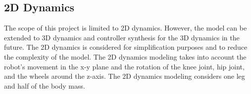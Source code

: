 \subsection{2D Dynamics}
The scope of this project is limited to 2D dynamics.
However, the model can be extended to 3D dynamics and controller synthesis for the 3D dynamics in the future.
The 2D dynamics is considered for simplification purposes and to reduce the complexity of the model.
The 2D dynamics modeling takes into account the robot's movement in the x-y plane and the rotation of the knee joint, hip joint, and the wheels around the z-axis.
The 2D dynamics modeling considers one leg and half of the body mass.
\newpage
